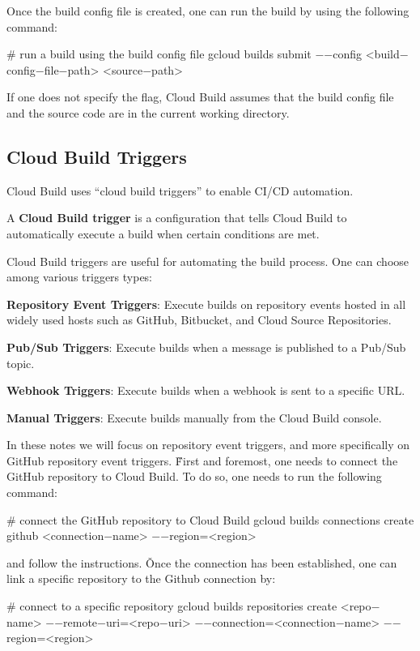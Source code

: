 Once the build config file is created, one can run the build by using the following command:
\begin{bash}
# run a build using the build config file
gcloud builds submit $-$$-$config <build$-$config$-$file$-$path> <source$-$path>
\end{bash}

If one does not specify the  flag, Cloud Build assumes that the build config file and the source code
are in the current working directory.

\subsection{Cloud Build Triggers}\label{subsec:cloud_build_triggers}

Cloud Build uses ``cloud build triggers'' to enable CI/CD automation.

A \textbf{Cloud Build trigger} is a configuration that tells Cloud Build to automatically execute a build when certain
conditions are met.
\ed

Cloud Build triggers are useful for automating the build process. One can choose among various triggers types:
\bit
\item \textbf{Repository Event Triggers}: Execute builds on repository events hosted in all widely used hosts such as
GitHub, Bitbucket, and Cloud Source Repositories.
\item \textbf{Pub/Sub Triggers}: Execute builds when a message is published to a Pub/Sub topic.
\item \textbf{Webhook Triggers}: Execute builds when a webhook is sent to a specific URL\@.
\item \textbf{Manual Triggers}: Execute builds manually from the Cloud Build console.
\eit

In these notes we will focus on repository event triggers, and more specifically on GitHub repository event triggers. \v

First and foremost, one needs to connect the GitHub repository to Cloud Build. To do so, one needs to run the following
command:
\begin{bash}
# connect the GitHub repository to Cloud Build
gcloud builds connections create github <connection$-$name> $-$$-$region=<region>
\end{bash}

and follow the instructions. \v

Once the connection has been established, one can link a specific repository to the Github connection by:
\begin{bash}
# connect to a specific repository
gcloud builds repositories create <repo$-$name>
    $-$$-$remote$-$uri=<repo$-$uri>
    $-$$-$connection=<connection$-$name>
    $-$$-$region=<region>
\end{bash}

